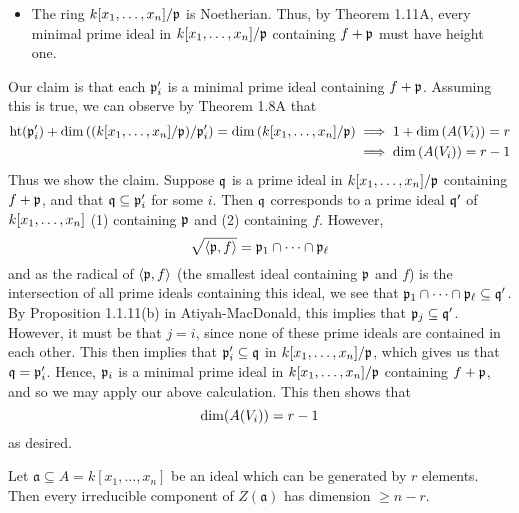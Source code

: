 \documentclass[10pt]{amsart}
\begin{document}
\begin{solution}
\begin{luke}
\begin{itemize}
        \item The ring $k[x_1, \dots, x_n]/\mathfrak{p}$ is Noetherian. Thus, by 
        Theorem 1.11A, every minimal prime ideal in $k[x_1, \dots, x_n]/\mathfrak{p}$
        containing $f + \mathfrak{p}$ must have height one.
    \end{itemize}
    Our claim is that each $\mathfrak{p}'_i$ is a minimal prime ideal 
    containing $f + \mathfrak{p}$. Assuming this is true, we can observe 
    by Theorem 1.8A that 
    \begin{align*}
        \operatorname{\rm{ht}}(\mathfrak{p}_i') + \operatorname{\rm{dim}}\left( (k[x_1, \dots, x_n]/\mathfrak{p})/\mathfrak{p}'_i \right) = \operatorname{\rm{dim}}\left( k[x_1, \dots, x_n]/\mathfrak{p} \right)
        &\implies 
        1 +  \operatorname{\rm{dim}}\left( A(V_i) \right) = r\\
        &\implies 
        \operatorname{\rm{dim}}\left( A(V_i) \right) = r - 1
    \end{align*}
    Thus we show the claim. Suppose $\mathfrak{q}$ is a prime ideal in $k[x_1, \dots, x_n]/\mathfrak{p}$ 
    containing $f + \mathfrak{p}$, and that $\mathfrak{q} \subseteq \mathfrak{p}'_i$ for some $i$. 
    Then $\mathfrak{q}$ corresponds to a prime ideal $\mathfrak{q}'$ of $k[x_1, \dots, x_n]$ (1) containing $\mathfrak{p}$ and (2) 
    containing $f$. However, 
    \[
        \sqrt{\left<\mathfrak{p}, f\right>} = \mathfrak{p}_1 \cap \cdots \cap \mathfrak{p}_{\ell}
    \]
    and as the radical of $\left<\mathfrak{p}, f\right>$ (the smallest ideal containing $\mathfrak{p}$ and $f$)
    is the intersection of all prime ideals containing this ideal, we see that 
    $\mathfrak{p}_1 \cap \cdots \cap \mathfrak{p}_{\ell} \subseteq \mathfrak{q}'$. By Proposition 1.1.11(b) in Atiyah-MacDonald, 
    this implies that $\mathfrak{p}_j \subseteq \mathfrak{q}'$. However, it must be that 
    $j = i$, since none of these prime ideals 
    are contained in each other. This then implies that 
    $\mathfrak{p}'_i \subseteq \mathfrak{q}$ in $k[x_1, \dots, x_n]/\mathfrak{p}$, which gives us that $\mathfrak{q} = \mathfrak{p}_i'$. 
    Hence, $\mathfrak{p}_i$ is a minimal prime ideal in $k[x_1, \dots, x_n]/\mathfrak{p}$ containing $f+\mathfrak{p}$, and 
    so we may apply our above calculation. This then shows that 
    \[
        \operatorname{\rm{dim}}(A(V_i)) = r - 1  
    \]
    as desired.
    \end{luke}
\end{solution}

\begin{exercise}[1.9]
    Let $\mathfrak{a} \subseteq A = k[x_1,\ldots,x_n]$ be an ideal which can be
    generated by $r$ elements.
    Then every irreducible component of $Z(\mathfrak{a})$ has dimension $\ge n-r$.
\end{exercise}
\end{document}
